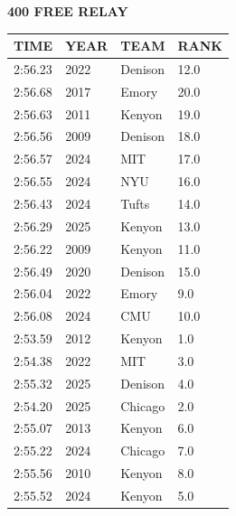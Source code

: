 \begin{table}[H]
\centering
\begin{minipage}[t]{0.6\textwidth}
\centering
\textbf{400 FREE RELAY}\\[0.1cm]
\begin{tabular}{@{}p{1.8cm}p{1.2cm}p{1.4cm}p{0.8cm}@{}}
\hline
    \textbf{TIME} & \textbf{YEAR} & \textbf{TEAM} & \textbf{RANK} \\
\hline
    2:56.23 & 2022 & Denison & 12.0 \\
    2:56.68 & 2017 & Emory & 20.0 \\
    2:56.63 & 2011 & Kenyon & 19.0 \\
    2:56.56 & 2009 & Denison & 18.0 \\
    2:56.57 & 2024 & MIT & 17.0 \\
    2:56.55 & 2024 & NYU & 16.0 \\
    2:56.43 & 2024 & Tufts & 14.0 \\
    2:56.29 & 2025 & Kenyon & 13.0 \\
    2:56.22 & 2009 & Kenyon & 11.0 \\
    2:56.49 & 2020 & Denison & 15.0 \\
    2:56.04 & 2022 & Emory & 9.0 \\
    2:56.08 & 2024 & CMU & 10.0 \\
    2:53.59 & 2012 & Kenyon & 1.0 \\
    2:54.38 & 2022 & MIT & 3.0 \\
    2:55.32 & 2025 & Denison & 4.0 \\
    2:54.20 & 2025 & Chicago & 2.0 \\
    2:55.07 & 2013 & Kenyon & 6.0 \\
    2:55.22 & 2024 & Chicago & 7.0 \\
    2:55.56 & 2010 & Kenyon & 8.0 \\
    2:55.52 & 2024 & Kenyon & 5.0 \\
\hline
\end{tabular}
\end{minipage}
\end{table}

